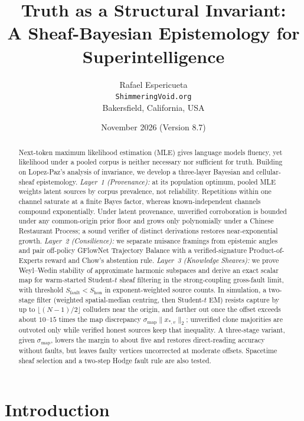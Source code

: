 \documentclass[11pt,a4paper]{article}
\title{\textbf{Truth as a Structural Invariant:\\A Sheaf-Bayesian Epistemology for Superintelligence}}
\author{Rafael Espericueta\\
\small \texttt{ShimmeringVoid.org}\\
\small Bakersfield, California, USA}
\date{November 2026 (Version 8.7)}
\theoremstyle{definition}
\theoremstyle{remark}
\begin{document}
\maketitle

\begin{abstract}
Next-token maximum likelihood estimation (MLE) gives language models fluency, yet likelihood under a pooled corpus is neither necessary nor sufficient for truth. Building on Lopez-Paz's analysis of invariance, we develop a three-layer Bayesian and cellular-sheaf epistemology. \emph{Layer~1 (Provenance):} at its population optimum, pooled MLE weights latent sources by corpus prevalence, not reliability. Repetitions within one channel saturate at a finite Bayes factor, whereas known-independent channels compound exponentially. Under latent provenance, unverified corroboration is bounded under any common-origin prior floor and grows only polynomially under a Chinese Restaurant Process; a sound verifier of distinct derivations restores near-exponential growth. \emph{Layer~2 (Consilience):} we separate nuisance framings from epistemic angles and pair off-policy GFlowNet Trajectory Balance with a verified-signature Product-of-Experts reward and Chow's abstention rule. \emph{Layer~3 (Knowledge Sheaves):} we prove Weyl--Wedin stability of approximate harmonic subspaces and derive an exact scalar map for warm-started Student-$t$ sheaf filtering in the strong-coupling gross-fault limit, with threshold $S_{\mathrm{fault}} < S_{\mathrm{hon}}$ in exponent-weighted source counts. In simulation, a two-stage filter (weighted spatial-median centring, then Student-$t$ EM) resists capture by up to $\lfloor(N-1)/2\rfloor$ colluders near the origin, and farther out once the offset exceeds about $10$--$15$ times the map discrepancy $\sigma_{\mathrm{map}}\|x_{*,v}\|_2$; unverified clone majorities are outvoted only while verified honest sources keep that inequality. A three-stage variant, given $\sigma_{\mathrm{map}}$, lowers the margin to about five and restores direct-reading accuracy without faults, but leaves faulty vertices uncorrected at moderate offsets. Spacetime sheaf selection and a two-step Hodge fault rule are also tested.
\end{abstract}

\section{Introduction}
\end{document}
